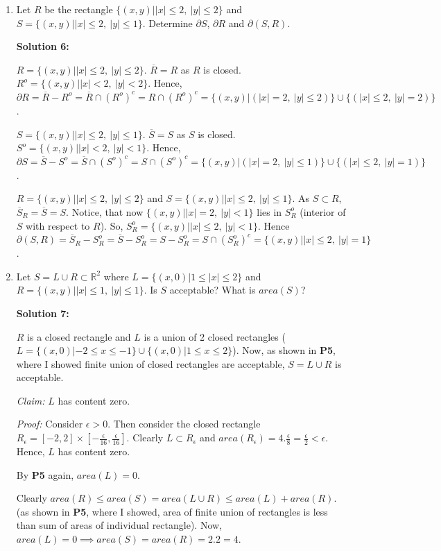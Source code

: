 \documentclass[11pt]{amsart}
\newcommand{\bbR}{\mathbb{R}}
\theoremstyle{definition}
\begin{document}
\begin{enumerate}[wide, labelwidth=!, labelindent=0pt]
\newpage
\item Let $R$ be the rectangle $\{(x,y)||x| \le 2,\ |y| \le 2\}$ and $S=\{(x,y)||x| \le 2,\ |y| \le 1\}$. Determine $\partial S$, $\partial R$ and $\partial(S,R)$.

\textbf{Solution 6:}

$R = \{(x,y)||x| \le 2,\ |y| \le 2\}$. $\overline{R} = R$ as $R$ is closed. $R^o = \{(x,y)||x| < 2,\ |y| < 2\}$. Hence, $\partial R = \overline{R} - R^o = \overline{R} \cap (R^o)^c = R \cap (R^o)^c = \{(x,y)|(|x| = 2,\ |y| \le 2)\} \cup \{(|x| \le 2,\ |y| = 2)\}$.

$S=\{(x,y)||x| \le 2,\ |y| \le 1\}$. $\overline{S} = S$ as $S$ is closed. $S^o = \{(x,y)||x| < 2,\ |y| < 1\}$. Hence, $\partial S = \overline{S} - S^o = \overline{S} \cap (S^o)^c = S \cap (S^o)^c = \{(x,y)|(|x| = 2,\ |y| \le 1)\} \cup \{(|x| \le 2,\ |y| = 1)\}$.

$R = \{(x,y)||x| \le 2,\ |y| \le 2\}$ and $S=\{(x,y)||x| \le 2,\ |y| \le 1\}$. As $S \subset R$, $\overline{S}_R = \overline{S} = S$. Notice, that now $\{(x,y)||x| = 2,\ |y| < 1\}$ lies in $S_R^o$ (interior of $S$ with respect to $R$). So, $S_R^o = \{(x,y)||x| \le 2,\ |y| < 1\}$. Hence $\partial (S,R) = \overline{S}_R - S_R^o = \overline{S} - S_R^o = S - S_R^o = S \cap (S_R^o)^c = \{(x,y)||x| \le 2,\ |y| = 1\}$.

\newpage
\item Let $S=L \cup R \subset \bbR^2$ where $L=\{(x,0)|1 \le |x| \le 2\}$ and 
$R=\{(x,y)||x| \le 1,\ |y| \le 1\}$. Is $S$ acceptable? What is $area(S)$?

\textbf{Solution 7:}

$R$ is a closed rectangle and $L$ is a union of 2 closed rectangles ($L = \{(x,0)|-2 \le x \le -1\} \cup \{(x,0)|1 \le x \le 2\}$). Now, as shown in \textbf{P5}, where I showed finite union of closed rectangles are acceptable, $S = L \cup R$ is acceptable.

\textit{Claim:} $L$ has content zero.

\textit{Proof:} Consider $\epsilon > 0$. Then consider the closed rectangle $R_{\epsilon} = [-2,2] \times [-\frac{\epsilon}{16},\frac{\epsilon}{16}]$. Clearly $L \subset R_{\epsilon}$ and $area(R_{\epsilon}) = 4.\frac{\epsilon}{8} = \frac{\epsilon}{2} < \epsilon$. Hence, $L$ has content zero.

By \textbf{P5} again, $area(L) = 0$.

Clearly $area(R) \le area(S) = area(L \cup R) \le area(L) + area(R)$. (as shown in \textbf{P5}, where I showed, area of finite union of rectangles is less than sum of areas of individual rectangle). Now, $area(L) = 0 \implies area(S) = area(R) = 2.2 = 4$.


\end{enumerate}
\end{document}
